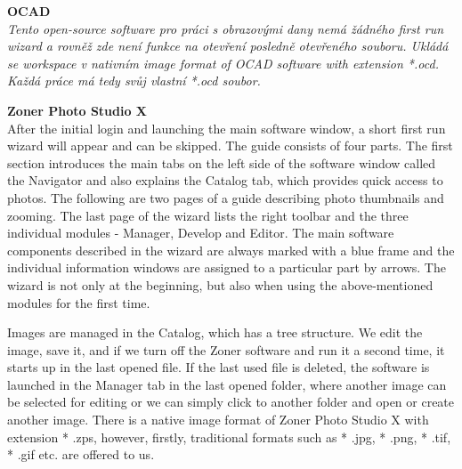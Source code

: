 \documentclass[a4paper,10pt,twoside]{article}
\begin{document}
\noindent \textbf{OCAD} \\

\noindent \textit{\color{red}Tento open-source software pro práci s obrazovými dany nemá žádného first run wizard a rovněž zde není funkce na otevření posledně otevřeného souboru. Ukládá se workspace v nativním image format of OCAD software with extension *.ocd. Každá práce má tedy svůj vlastní *.ocd soubor.}

\noindent \textbf{Zoner Photo Studio X} \\

\noindent After the initial login and launching the main software window, a short first run wizard will appear and can be skipped. The guide consists of four parts. The first section introduces the main tabs on the left side of the software window called the Navigator and also explains the Catalog tab, which provides quick access to photos. The following are two pages of a guide describing photo thumbnails and zooming. The last page of the wizard lists the right toolbar and the three individual modules - Manager, Develop and Editor. The main software components described in the wizard are always marked with a blue frame and the individual information windows are assigned to a particular part by arrows. The wizard is not only at the beginning, but also when using the above-mentioned modules for the first time.

Images are managed in the Catalog, which has a tree structure. We edit the image, save it, and if we turn off the Zoner software and run it a second time, it starts up in the last opened file. If the last used file is deleted, the software is launched in the Manager tab in the last opened folder, where another image can be selected for editing or we can simply click to another folder and open or create another image. There is a native image format of Zoner Photo Studio X with extension * .zps, however, firstly, traditional formats such as * .jpg, * .png, * .tif, * .gif etc. are offered to us.
\end{document}
